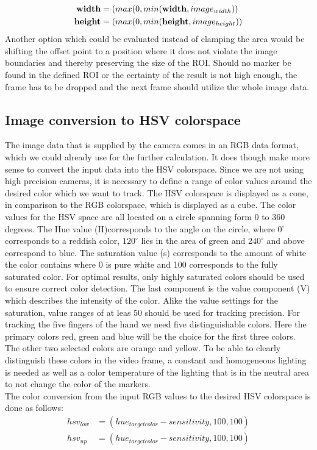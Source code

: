 \begin{equation}
\begin{split}
\textbf{width}&=\text(max(0,min(\mathbf{width},image_{width}))\\
\textbf{height}&=\text(max(0,min(\mathbf{height},image_{height}))
\end{split}
\end{equation}
Another option which could be evaluated instead of clamping the area would be shifting the offset point to a position where it does not violate the image boundaries and  thereby preserving the size of the ROI.
Should no marker be found in the defined ROI or the certainty of the result is not high enough, the frame has to be dropped and the next frame should utilize the whole image data.
\subsection{Image conversion to HSV colorspace}
The image data that is supplied by the camera comes in an RGB data format, which we could already use for the further calculation. It does though make more sense to convert the input data into the HSV colorspace. Since we are not using high precision cameras, it is necessary to define a range of color values around the desired color which we want to track. The HSV colorspace is displayed as a cone, in comparison to the RGB colorspace, which is displayed as a cube. The color values for the HSV space are all located on a circle spanning form 0 to 360 degrees. The Hue value (H)corresponds to the angle on the circle, where $0^\circ$ corresponds to a reddish color, $120^\circ$ lies in the area of green and $240^\circ$ and above correspond to blue. The saturation value (s) corresponds to the amount of white the color contains  where 0 is pure white and 100 corresponds to the fully saturated color. For optimal results, only highly saturated colors should be used to ensure correct color detection. The last component is the value component (V) which describes the intensity of the color. Alike the value settings for the saturation, value ranges of at leas 50 should be used for tracking precision.
For tracking the five fingers of the hand we need five distinguishable colors. Here the primary colors red, green and blue will be the choice for the first three colors. The other two selected colors are orange and yellow. To be able to clearly distinguish these colors in the video frame, a constant and homogeneous lighting is needed as well as a color temperature of the lighting that is in the neutral area to not change the color of the markers.
\\The color conversion from the input RGB values to the desired HSV colorspace is done as follows:
\begin{equation}
\begin{split}
hsv_{low}&=(hue_{targetcolor}-sensitivity,100,100)\\
hsv_{up}&=(hue_{targetcolor}-sensitivity,100,100)\\
\end{split}
\end{equation}
